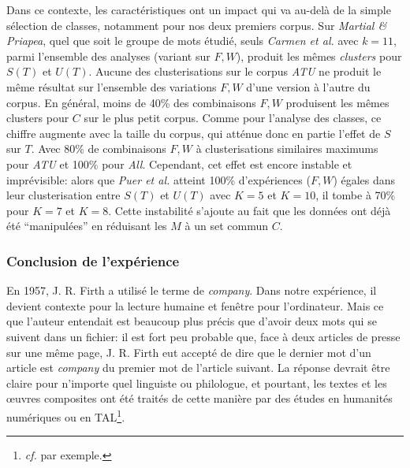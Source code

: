 Dans ce contexte, les caractéristiques ont un impact qui va au-delà de la simple sélection de classes, notamment pour nos deux premiers corpus. Sur \textit{Martial \& Priapea}, quel que soit le groupe de mots étudié, seuls \textit{Carmen et al.} avec $k=11$, parmi l'ensemble des analyses (variant sur $F,W$), produit les mêmes \textit{clusters} pour $S(T)$ et $U(T)$. Aucune des clusterisations sur le corpus \textit{ATU} ne produit le même résultat sur l'ensemble des variations $F,W$ d'une version à l'autre du corpus. En général, moins de 40\% des combinaisons $F,W$ produisent les mêmes clusters pour $C$ sur le plus petit corpus. Comme pour l'analyse des classes, ce chiffre augmente avec la taille du corpus, qui atténue donc en partie l'effet de $S$ sur $T$. Avec 80\% de combinaisons $F,W$ à clusterisations similaires maximums pour \textit{ATU} et 100\% pour \textit{All}. Cependant, cet effet est encore instable et imprévisible: alors que \textit{Puer et al.} atteint 100\% d'expériences ($F,W$) égales dans leur clusterisation entre $S(T)$ et $U(T)$ avec $K=5$ et $K=10$, il tombe à 70\% pour $K=7$ et $K=8$. Cette instabilité s'ajoute au fait que les données ont déjà été \enquote{manipulées} en réduisant les $M$ à un set commun $C$.

\subsubsection{Conclusion de l'expérience}


En 1957, J. R. Firth a utilisé le terme de \textit{company}. Dans notre expérience, il devient contexte pour la lecture humaine et fenêtre pour l'ordinateur. Mais ce que l'auteur entendait est beaucoup plus précis que d'avoir deux mots qui se suivent dans un fichier: il est fort peu probable que, face à deux articles de presse sur une même page, J. R. Firth eut accepté de dire que le dernier mot d'un article est \textit{company} du premier mot de l'article suivant. La réponse devrait être claire pour n'importe quel linguiste ou philologue, et pourtant, les textes et les œuvres composites ont été traités de cette manière par des études en humanités numériques ou en TAL\footnote{\textit{cf.} \textcite{kontges_measuring_2020} par exemple.}. 

